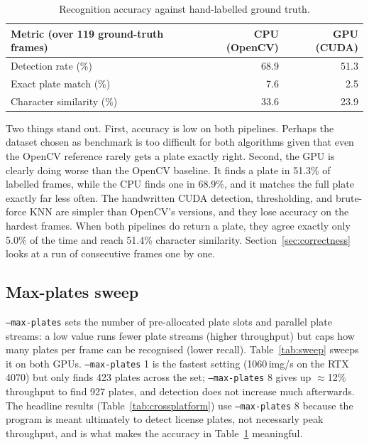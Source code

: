 \begin{table}[H]
\centering
\small
\begin{tabular}{lrr}
\toprule
Metric (over 119 ground-truth frames) & CPU (OpenCV) & GPU (CUDA) \\
\midrule
Detection rate (\%)        & 68.9 & 51.3 \\
Exact plate match (\%)     &  7.6 &  2.5 \\
Character similarity (\%)  & 33.6 & 23.9 \\
\bottomrule
\end{tabular}
\normalsize
\caption{Recognition accuracy against hand-labelled ground truth.}
\label{tab:accuracy}
\end{table}

Two things stand out. 
First, accuracy is low on both pipelines. Perhaps the dataset chosen as benchmark is too difficult for both algorithms given that even the OpenCV reference rarely gets a plate exactly right. Second, the GPU is clearly doing worse than the OpenCV baseline. 
It finds a plate in 51.3\% of labelled frames, while the CPU finds one in 68.9\%, and it matches the full plate exactly far less often. 
The handwritten CUDA detection, thresholding, and brute-force KNN are simpler than OpenCV's versions, and they lose accuracy on the hardest frames. When both pipelines do return a plate, they agree exactly only 5.0\% of the time and reach 51.4\% character similarity. 
Section~\ref{sec:correctness} looks at a run of consecutive frames one by one.

\subsection{Max-plates sweep}
\label{sec:sweep}

\texttt{--max-plates} sets the number of pre-allocated plate slots and parallel plate streams: a low value runs fewer plate streams (higher throughput) but caps how many plates per frame can be recognised (lower recall).
Table~\ref{tab:sweep} sweeps it on both GPUs.
\texttt{--max-plates} 1 is the fastest setting (1060\,img/s on the RTX 4070) but only finds 423 plates across the set; \texttt{--max-plates} 8 gives up $\approx$12\% throughput to find 927 plates, and detection does not increase much afterwards.
The headline results (Table~\ref{tab:crossplatform}) use \texttt{--max-plates} 8 because the program is meant ultimately to detect license plates, not necessarly peak throughput, and is what makes the accuracy in Table~\ref{tab:accuracy} meaningful.

